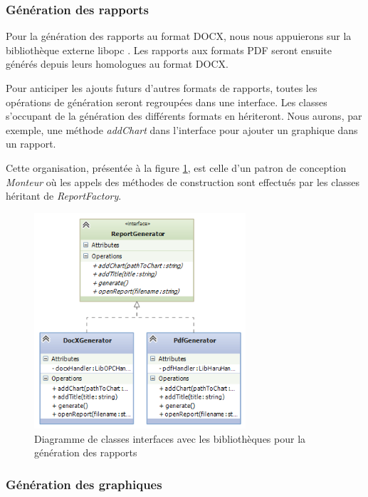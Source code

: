 \documentclass[a4paper,titlepage,french]{report}
\begin{document}
\subsubsection{Génération des rapports}

Pour la génération des rapports au format DOCX, nous nous appuierons sur la bibliothèque externe libopc \cite{website:libopc}.
Les rapports aux formats PDF seront ensuite générés depuis leurs homologues au format DOCX.

Pour anticiper les ajouts futurs d'autres formats de rapports, toutes les opérations de génération seront regroupées dans une interface.
Les classes s'occupant de la génération des différents formats en hériteront.
Nous aurons, par exemple, une méthode \textit{addChart} dans l'interface pour ajouter un graphique dans un rapport.

Cette organisation, présentée à la figure \ref{fig:diagramme-classes-interface-report}, est celle d'un patron de conception \textit{Monteur} où les appels des méthodes de construction sont effectués par les classes héritant de \textit{ReportFactory}.

\begin{figure}
  	\center
  	\includegraphics[width=0.7\textwidth]{diagramme-classes-interface-report.png}
  	\caption{Diagramme de classes interfaces avec les bibliothèques pour la génération des rapports}
  	\label{fig:diagramme-classes-interface-report}
\end{figure}


\subsubsection{Génération des graphiques}
\end{document}
